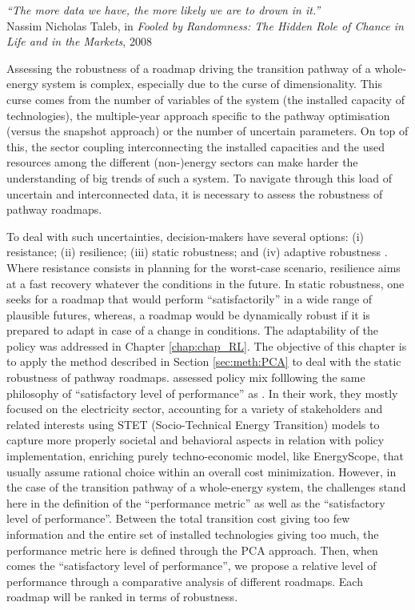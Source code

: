 \vspace{-0.2cm}
\begin{flushright}
\emph{``The more data we have, the more likely we are to drown in it.''}\\
Nassim Nicholas Taleb, in \textit{Fooled by Randomness: The Hidden Role of Chance in Life and in the Markets}, 2008
\end{flushright}
\vspace{0.4cm}

Assessing the robustness of a roadmap driving the transition pathway of a whole-energy system is complex, especially due to the curse of dimensionality. This curse comes from the number of variables of the system (\eg the installed capacity of technologies), the multiple-year approach specific to the pathway optimisation (\ie versus the snapshot approach) or the number of uncertain parameters. On top of this, the sector coupling interconnecting the installed capacities and the used resources among the different (non-)energy sectors can make harder the understanding of big trends of such a system. To navigate through this load of uncertain and interconnected data, it is necessary to assess the robustness of pathway roadmaps.

To deal with such uncertainties, decision-makers have several options: (i) resistance; (ii) resilience; (iii) static robustness; and (iv) adaptive robustness \cite{walker2012deep}. Where resistance consists in planning for the worst-case scenario, resilience aims at a fast recovery whatever the conditions in the future. In static robustness, one seeks for a roadmap that would perform ``satisfactorily'' in a wide range of plausible futures, whereas, a roadmap would be dynamically robust if it is prepared to adapt in case of a change in conditions. The adaptability of the policy was addressed in Chapter \ref{chap:chap_RL}. The objective of this chapter is to apply the method described in Section \ref{sec:meth:PCA} to deal with the static robustness of pathway roadmaps.  \citet{castrejon2020making} assessed policy mix folllowing the same philosophy of ``satisfactory level of performance'' as \cite{walker2012deep}. In their work, they mostly focused on the electricity sector, accounting for a variety of stakeholders and related interests using STET (Socio-Technical Energy Transition) models to capture more properly societal and behavioral aspects in relation with policy implementation, enriching purely techno-economic model, like EnergyScope, that usually assume rational choice within an overall cost minimization.  However, in the case of the transition pathway of a whole-energy system, the challenges stand here in the definition of the ``performance metric'' as well as the ``satisfactory level of performance''. Between the total transition cost giving too few information and the entire set of installed technologies giving too much, the performance metric here is defined through the \gls{PCA} approach. Then, when comes the ``satisfactory level of performance'', we propose a relative level of performance through a comparative analysis of different roadmaps. Each roadmap will be ranked in terms of robustness.

